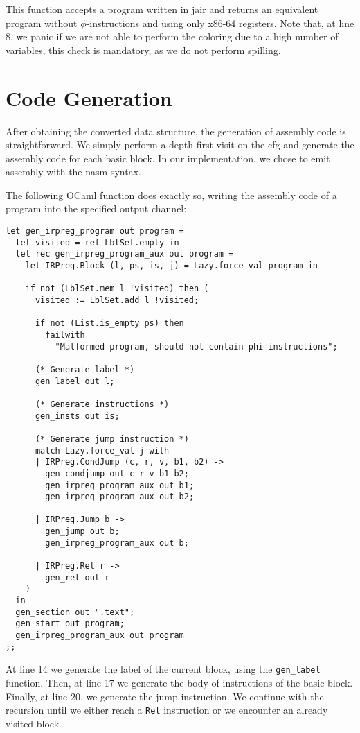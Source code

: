 This function accepts a program written in \gls{jair} and returns an equivalent program without $\phi$-instructions and using only x86-64 registers.
Note that, at line 8, we panic if we are not able to perform the coloring due to a high number of variables, this check is mandatory, as we do not perform spilling.

\section{Code Generation}
\label{sec:codegen}

After obtaining the converted data structure, the generation of assembly code is straightforward. We simply perform a depth-first visit on the \gls{cfg} and generate the assembly code for each basic block.
In our implementation, we chose to emit assembly with the \gls{nasm} syntax.

The following OCaml function does exactly so, writing the assembly code of a program into the specified output channel:

\begin{lstlisting}[style=OCaml]
let gen_irpreg_program out program =
  let visited = ref LblSet.empty in
  let rec gen_irpreg_program_aux out program =
    let IRPreg.Block (l, ps, is, j) = Lazy.force_val program in

    if not (LblSet.mem l !visited) then (
      visited := LblSet.add l !visited;

      if not (List.is_empty ps) then
        failwith
          "Malformed program, should not contain phi instructions";

      (* Generate label *)
      gen_label out l;

      (* Generate instructions *)
      gen_insts out is;

      (* Generate jump instruction *)
      match Lazy.force_val j with
      | IRPreg.CondJump (c, r, v, b1, b2) ->
        gen_condjump out c r v b1 b2;
        gen_irpreg_program_aux out b1;
        gen_irpreg_program_aux out b2;

      | IRPreg.Jump b ->
        gen_jump out b;
        gen_irpreg_program_aux out b;

      | IRPreg.Ret r ->
        gen_ret out r
    )
  in
  gen_section out ".text";
  gen_start out program;
  gen_irpreg_program_aux out program
;;
\end{lstlisting}

At line 14 we generate the label of the current block, using the \texttt{gen\_label} function. Then, at line 17 we generate the body of instructions of the basic block. Finally, at line 20, we generate the jump instruction. We continue with the recursion until we either reach a \texttt{Ret} instruction or we encounter an already visited block.

